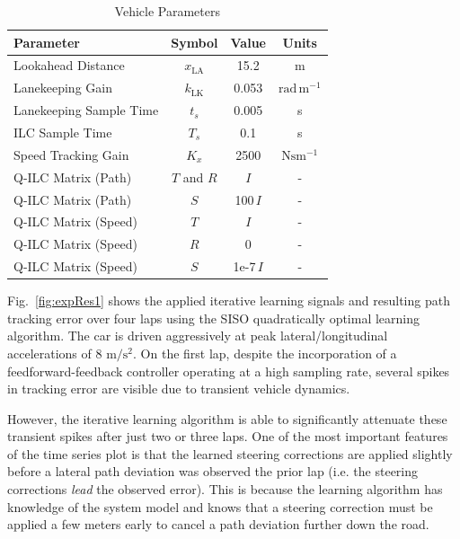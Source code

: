 \documentclass[9pt,shortpaper,twoside,web]{ieeecolor}
\begin{document}
{{{\begin{table}[tb]
\begin{center}
\caption{Vehicle Parameters}\label{tb:ilcprm}
\begin{tabular}{lccc}
Parameter & Symbol & Value & Units \\\hline
Lookahead Distance       & $x_\mathrm{LA}$          &  15.2 & $\mathrm{m} $ \\
Lanekeeping Gain         & $k_{\mathrm{LK}}$         & 0.053 & $\mathrm{rad\,m^{-1}}$\\
Lanekeeping Sample Time  & $t_s$                        & 0.005 & s\\
ILC Sample Time          & $T_s$                        & 0.1   & s\\
Speed Tracking Gain                & $K_x$           & 2500 & $\mathrm{Nsm^{-1}}$\\
Q-ILC Matrix (Path)            & $T$ and $R$              &  $I$      & - \\
Q-ILC Matrix  (Path)           & $S$                       & 100\,$I$  & - \\
Q-ILC Matrix (Speed)            & $T$              &  $I$      & - \\
Q-ILC Matrix (Speed)            & $R$              &  $0$      & - \\
Q-ILC Matrix  (Speed)           & $S$                       & 1e-7\,$I$  & - \\\hline
\end{tabular}
\end{center}
\end{table}


Fig.~\ref{fig:expRes1} shows the applied iterative learning signals and resulting path tracking error over four laps using the SISO
quadratically optimal learning algorithm. The car is driven
aggressively at peak lateral/longitudinal accelerations of 8 $\mathrm{m/s^2}$. On the first lap, despite the 
incorporation of a feedforward-feedback controller operating at a high sampling rate, several spikes in tracking error are visible due to transient vehicle dynamics.

However, the iterative learning algorithm is able to significantly attenuate these transient spikes after just two or three laps. 
One of the most important features of the time series plot is that the learned steering corrections are applied slightly before a lateral path deviation was observed the prior lap (i.e. the steering corrections \textit{lead} the observed error). This is because the learning
algorithm has knowledge of the system model and knows that a steering correction must be applied a few meters early to cancel a path deviation
further down the road.

}}}
\end{document}
